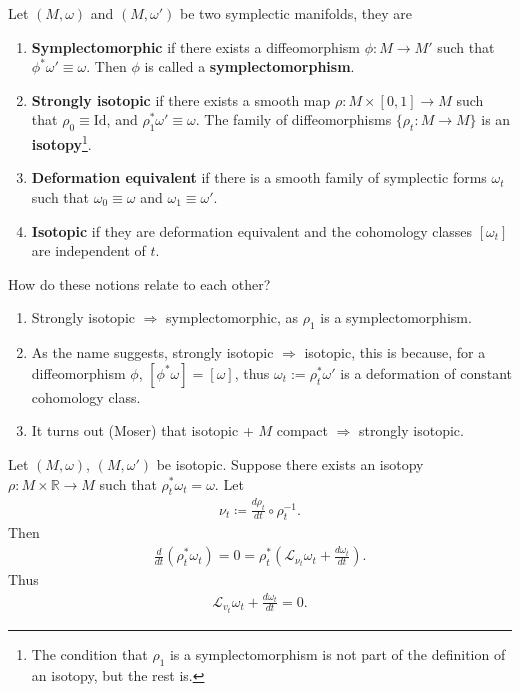 \documentclass[11pt, final]{article}
\begin{document}
\begin{definition}
	Let $(M,\omega)$ and $(M,\omega')$ be two symplectic manifolds, they are
		\begin{enumerate}[label=(\roman*)]
			\item \textbf{Symplectomorphic} if there exists a diffeomorphism $ \phi: M \to M' $ such that $\phi^* \omega' \equiv \omega$. Then $\phi$ is called a \textbf{symplectomorphism}.
			\item \textbf{Strongly isotopic} if there exists a smooth map $\rho : M \times [0,1] \to M$ such that $\rho_0 \equiv \mathrm{Id}$, and $\rho_1^* \omega' \equiv \omega$. The family of diffeomorphisms ${\{ \rho_t : M \to M \}}$ is an \textbf{isotopy}\footnote{The condition that $\rho_1$ is a symplectomorphism is not part of the definition of an isotopy, but the rest is.}.
			\item \textbf{Deformation equivalent} if there is a smooth family of symplectic forms $\omega_t$ such that $\omega_0 \equiv \omega$ and $\omega_1 \equiv \omega'$.
			\item \textbf{Isotopic} if they are deformation equivalent and the cohomology classes $[\omega_t]$ are independent of $t$.
		\end{enumerate}
\end{definition}
\begin{remark}
	How do these notions relate to each other?
		\begin{enumerate}[label = (\Roman*)]
			\item Strongly isotopic $\Rightarrow$ symplectomorphic, as $\rho_1$ is a symplectomorphism.
			\item As the name suggests, strongly isotopic $\Rightarrow$ isotopic, this is because, for a {diffeomorphism} $\phi$, $[\phi^* \omega] = [\omega]$, thus $\omega_t := \rho_t^* \omega'$ is a deformation of constant cohomology class.
			\item It turns out (Moser) that isotopic + $M$ compact $\Rightarrow$ strongly isotopic.
		\end{enumerate}
\end{remark}
\begin{prop}
	Let $(M,\omega)$, $(M,\omega')$ be isotopic. Suppose there exists an isotopy $\rho: M \times \mathbb{R} \to M$ such that $\rho_t^* \omega_t = \omega$. Let
		\begin{align}
			\nu_t \coloneqq \frac{d\rho_t}{dt} \circ \rho_t^{-1}.
		\end{align}
	Then
		\begin{align}
			\frac{d}{dt}(\rho^*_t \omega_t) = 0 = \rho^*_t (\mathcal{L}_{\nu_t} \omega_t + \frac{d \omega_t}{dt}).
		\end{align}
	Thus
		\begin{align}\label{eq:differentialMoser}
			\mathcal{L}_{v_t} \omega_t + \frac{d \omega_t}{dt} = 0.
		\end{align}
\end{prop}
\end{document}
